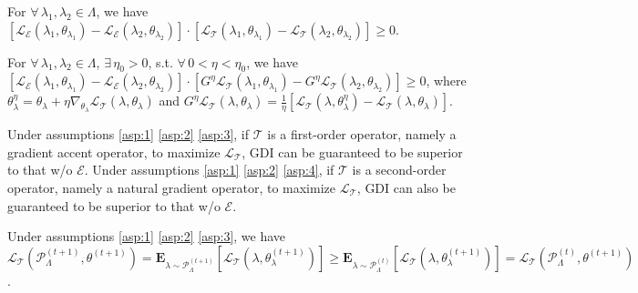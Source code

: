\begin{Assumption}
    For $\forall\, \lambda_1, \lambda_2 \in \Lambda$, we have
    $[ \mathcal{L}_{\mathcal{E}} (\lambda_1, \theta_{\lambda_1})  -  \mathcal{L}_{\mathcal{E}} (\lambda_2, \theta_{\lambda_2}) ] \cdot
    [ \mathcal{L}_{\mathcal{T}} (\lambda_1, \theta_{\lambda_1})  -  \mathcal{L}_{\mathcal{T}} (\lambda_2, \theta_{\lambda_2}) ] \geq 0$.
\label{asp:3}
\end{Assumption}

\begin{Assumption}
    For $\forall\, \lambda_1, \lambda_2 \in \Lambda$,
    $\exists\, \eta_0 > 0$, s.t. $\forall\, 0 < \eta < \eta_0$, we have
    $[ \mathcal{L}_{\mathcal{E}} (\lambda_1, \theta_{\lambda_1})  -  \mathcal{L}_{\mathcal{E}} (\lambda_2, \theta_{\lambda_2}) ] \cdot
    [ G^{\eta} \mathcal{L}_{\mathcal{T}} (\lambda_1, \theta_{\lambda_1}) 
    - G^{\eta} \mathcal{L}_{\mathcal{T}} (\lambda_2, \theta_{\lambda_2}) ] \geq 0$,
    where $\theta_{\lambda}^{\eta} = \theta_{\lambda} + \eta \nabla_{\theta_{\lambda}} \mathcal{L}_{\mathcal{T}} (\lambda, \theta_{\lambda})$ and
    $G^{\eta} \mathcal{L}_{\mathcal{T}} (\lambda, \theta_{\lambda})
    = \frac{1}{\eta} \left[\mathcal{L}_{\mathcal{T}} (\lambda, \theta_{\lambda}^{\eta}) - \mathcal{L}_{\mathcal{T}} (\lambda, \theta_{\lambda}) \right]$.
\label{asp:4}
\end{Assumption}

Under assumptions \eqref{asp:1} \eqref{asp:2} \eqref{asp:3}, if $\mathcal{T}$ is a first-order operator, namely a gradient accent operator, to maximize $\mathcal{L}_{\mathcal{T}}$, GDI can be guaranteed to be superior to that w/o $\mathcal{E}$.
Under assumptions \eqref{asp:1} \eqref{asp:2} \eqref{asp:4}, if $\mathcal{T}$ is a second-order operator, namely a natural gradient operator, to maximize $\mathcal{L}_{\mathcal{T}}$, GDI can also be guaranteed to be superior to that w/o $\mathcal{E}$.

\begin{Theorem}
    Under assumptions \eqref{asp:1} \eqref{asp:2} \eqref{asp:3}, we have
    $\mathcal{L}_{\mathcal{T}} (\mathcal{P}_{\Lambda}^{(t+1)}, \theta^{(t+1)}) 
     = \textbf{E}_{\lambda \sim \mathcal{P}_{\Lambda}^{(t+1)}}  [\mathcal{L}_{\mathcal{T}} (\lambda, \theta^{(t+1)}_{\lambda})]
     \geq \textbf{E}_{\lambda \sim \mathcal{P}_{\Lambda}^{(t)}}  [\mathcal{L}_{\mathcal{T}} (\lambda, \theta^{(t+1)}_{\lambda})]
     = \mathcal{L}_{\mathcal{T}} (\mathcal{P}_{\Lambda}^{(t)}, \theta^{(t+1)})$.
\label{thm:1st_gdi}
\end{Theorem}

